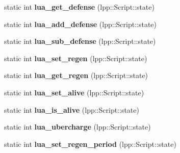 \begin{DoxyCompactItemize}
\item 
static int {\bfseries lua\+\_\+get\+\_\+defense} (lpp\+::\+Script\+::state)\hypertarget{class_lua_interface_a7211d7b12324092ef32f9cb14ff3d72d}{}\label{class_lua_interface_a7211d7b12324092ef32f9cb14ff3d72d}

\item 
static int {\bfseries lua\+\_\+add\+\_\+defense} (lpp\+::\+Script\+::state)\hypertarget{class_lua_interface_a7c7fe01034e38333da9e96ab27625aca}{}\label{class_lua_interface_a7c7fe01034e38333da9e96ab27625aca}

\item 
static int {\bfseries lua\+\_\+sub\+\_\+defense} (lpp\+::\+Script\+::state)\hypertarget{class_lua_interface_aec8dc930ccea985b6b6eab74e101c396}{}\label{class_lua_interface_aec8dc930ccea985b6b6eab74e101c396}

\item 
static int {\bfseries lua\+\_\+set\+\_\+regen} (lpp\+::\+Script\+::state)\hypertarget{class_lua_interface_ae24fc32788fa5ddd329240717c2d763b}{}\label{class_lua_interface_ae24fc32788fa5ddd329240717c2d763b}

\item 
static int {\bfseries lua\+\_\+get\+\_\+regen} (lpp\+::\+Script\+::state)\hypertarget{class_lua_interface_a67d8abc04d23f6a67b741ec03cf31716}{}\label{class_lua_interface_a67d8abc04d23f6a67b741ec03cf31716}

\item 
static int {\bfseries lua\+\_\+set\+\_\+alive} (lpp\+::\+Script\+::state)\hypertarget{class_lua_interface_ada0a566f805f2cf2285e240ecf3219d4}{}\label{class_lua_interface_ada0a566f805f2cf2285e240ecf3219d4}

\item 
static int {\bfseries lua\+\_\+is\+\_\+alive} (lpp\+::\+Script\+::state)\hypertarget{class_lua_interface_a35fb2e692ac8a723821dc377013ec316}{}\label{class_lua_interface_a35fb2e692ac8a723821dc377013ec316}

\item 
static int {\bfseries lua\+\_\+ubercharge} (lpp\+::\+Script\+::state)\hypertarget{class_lua_interface_adea2627139d989f31c6e5dd6ca96c744}{}\label{class_lua_interface_adea2627139d989f31c6e5dd6ca96c744}

\item 
static int {\bfseries lua\+\_\+set\+\_\+regen\+\_\+period} (lpp\+::\+Script\+::state)\hypertarget{class_lua_interface_ad67c7c1b2e202ab16d977cd37b905bea}{}\label{class_lua_interface_ad67c7c1b2e202ab16d977cd37b905bea}


\end{DoxyCompactItemize}
